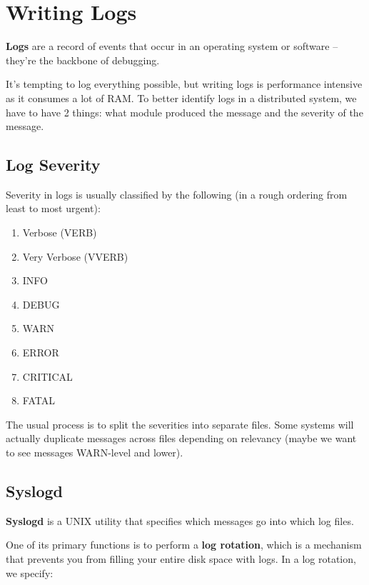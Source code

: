 \documentclass{report}
\newcommand{\npar}{\par\noindent}
\newcommand{\vpar}{\vspace{1em}\npar}
\begin{document}
\section{Writing Logs}

\par \textbf{Logs} are a record of events that occur in an operating system or software -- they're the backbone of debugging.

\vpar It's tempting to log everything possible, but writing logs is performance intensive as it consumes a lot of RAM. To better identify logs in a distributed system, we have to have 2 things: what module produced the message and the severity of the message.

\subsection{Log Severity}

\par Severity in logs is usually classified by the following (in a rough ordering from least to most urgent):

\begin{enumerate}
    \item Verbose (VERB)
    \item Very Verbose (VVERB)
    \item INFO
    \item DEBUG
    \item WARN
    \item ERROR
    \item CRITICAL
    \item FATAL
\end{enumerate}

\npar The usual process is to split the severities into separate files. Some systems will actually duplicate messages across files depending on relevancy (maybe we want to see messages WARN-level and lower).

\subsection{Syslogd}

\par \textbf{Syslogd} is a UNIX utility that specifies which messages go into which log files.

\vpar One of its primary functions is to perform a \textbf{log rotation}, which is a mechanism that prevents you from filling your entire disk space with logs. In a log rotation, we specify:
\end{document}
